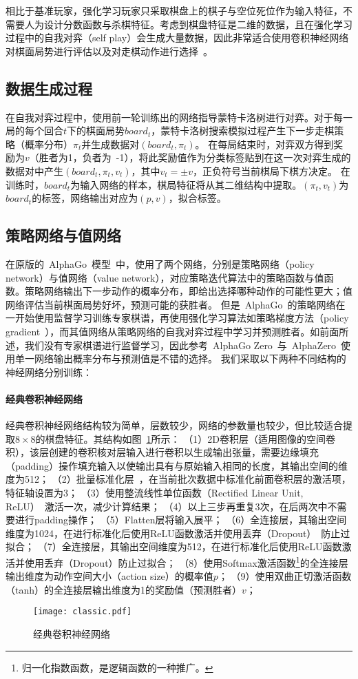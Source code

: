 相比于基准玩家，强化学习玩家只采取棋盘上的棋子与空位死位作为输入特征，不需要人为设计分数函数与杀棋特征。考虑到棋盘特征是二维的数据，且在强化学习过程中的自我对弈（self play）会生成大量数据，因此非常适合使用卷积神经网络对棋面局势进行评估以及对走棋动作进行选择~\cite{Silver2016}。

\subsection{数据生成过程}
在自我对弈过程中，使用前一轮训练出的网络指导蒙特卡洛树进行对弈。对于每一局的每个回合$t$下的棋面局势$board_{t}$，蒙特卡洛树搜索模拟过程产生下一步走棋策略（概率分布）$\pi_{t}$并生成数据对$(board_{t},\pi_{t})$。
在每局结束时，对弈双方得到奖励为$v$（胜者为1，负者为~-1），将此奖励值作为分类标签贴到在这一次对弈生成的数据对中产生$(board_{t},\pi_{t},v_{t})$，其中$v_{t}=\pm v$，正负符号当前棋局下棋方决定。
在训练时，$board_{t}$为输入网络的样本，棋局特征将从其二维结构中提取。$(\pi_{t},v_{t})$为$board_{t}$的标签，网络输出对应为$(p,v)$，拟合标签。
\subsection{策略网络与值网络}
在原版的~AlphaGo~模型~\cite{Silver2016}中，使用了两个网络，分别是策略网络（policy network）与值网络（value network），对应策略迭代算法中的策略函数与值函数。策略网络输出下一步动作的概率分布，即给出选择哪种动作的可能性更大；值网络评估当前棋面局势好坏，预测可能的获胜者。
但是~AlphaGo~的策略网络在一开始使用监督学习训练专家棋谱，再使用强化学习算法如策略梯度方法（policy gradient~\cite{silver2014deterministic}），而其值网络从策略网络的自我对弈过程中学习并预测胜者。如前面所述，我们没有专家棋谱进行监督学习，因此参考~AlphaGo Zero~与~AlphaZero~使用单一网络输出概率分布与预测值是不错的选择。
我们采取以下两种不同结构的神经网络分别训练：
\paragraph{经典卷积神经网络}
经典卷积神经网络结构较为简单，层数较少，网络的参数量也较少，但比较适合提取$8\times8$的棋盘特征。其结构如图~\ref{fig:cnn}所示：
（1）2D卷积层（适用图像的空间卷积），该层创建的卷积核对层输入进行卷积以生成输出张量，需要边缘填充（padding）操作填充输入以使输出具有与原始输入相同的长度，其输出空间的维度为512；
（2）批量标准化层~\cite{batchnorm}，在当前批次数据中标准化前面卷积层的激活项，特征轴设置为3；
（3）使用整流线性单位函数（Rectified Linear Unit, ReLU）~\cite{xu2015empirical}激活一次，减少计算结果；
（4）以上三步再重复3次，在后两次中不需要进行padding操作；
（5）Flatten层将输入展平；
（6）全连接层，其输出空间维度为1024，在进行标准化后使用ReLU函数激活并使用丢弃（Dropout）~\cite{srivastava2014dropout}防止过拟合；
（7）全连接层，其输出空间维度为512，在进行标准化后使用ReLU函数激活并使用丢弃（Dropout）防止过拟合；
（8）使用Softmax激活函数\footnote{归一化指数函数，是逻辑函数的一种推广。}的全连接层输出维度为动作空间大小（action size）的概率值$p$；
（9）使用双曲正切激活函数（tanh）的全连接层输出维度为1的奖励值（预测胜者）$v$；
\begin{figure}[H]
    \centering
    \texttt{[image: classic.pdf]}
    \caption[cnn]{%
    经典卷积神经网络%
      }
    \label{fig:cnn}
\end{figure}
